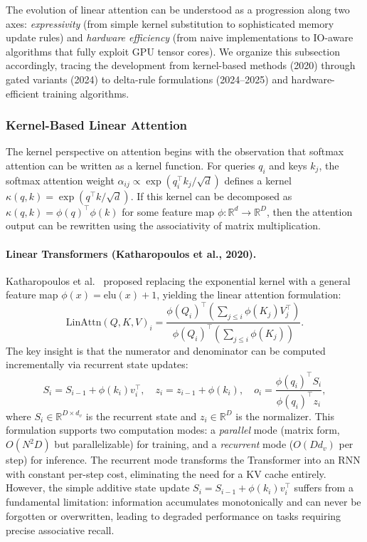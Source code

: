 The evolution of linear attention can be understood as a progression along two axes: \emph{expressivity} (from simple kernel substitution to sophisticated memory update rules) and \emph{hardware efficiency} (from naive implementations to IO-aware algorithms that fully exploit GPU tensor cores). We organize this subsection accordingly, tracing the development from kernel-based methods (2020) through gated variants (2024) to delta-rule formulations (2024--2025) and hardware-efficient training algorithms.

\subsubsection{Kernel-Based Linear Attention}
\label{subsubsec:kernel-linear}

The kernel perspective on attention begins with the observation that softmax attention can be written as a kernel function. For queries $q_i$ and keys $k_j$, the softmax attention weight $\alpha_{ij} \propto \exp(q_i^\top k_j / \sqrt{d})$ defines a kernel $\kappa(q, k) = \exp(q^\top k / \sqrt{d})$. If this kernel can be decomposed as $\kappa(q, k) = \phi(q)^\top \phi(k)$ for some feature map $\phi: \mathbb{R}^d \to \mathbb{R}^D$, then the attention output can be rewritten using the associativity of matrix multiplication.

\paragraph{Linear Transformers (Katharopoulos et al., 2020).}
Katharopoulos et al.~\cite{katharopoulos2020transformers} proposed replacing the exponential kernel with a general feature map $\phi(x) = \text{elu}(x) + 1$, yielding the linear attention formulation:
\begin{equation}
\text{LinAttn}(Q, K, V)_i = \frac{\phi(Q_i)^\top \left(\sum_{j \leq i} \phi(K_j) V_j^\top\right)}{\phi(Q_i)^\top \left(\sum_{j \leq i} \phi(K_j)\right)}.
\label{eq:linear-attn}
\end{equation}
The key insight is that the numerator and denominator can be computed incrementally via recurrent state updates:
\begin{equation}
S_i = S_{i-1} + \phi(k_i) v_i^\top, \quad z_i = z_{i-1} + \phi(k_i), \quad o_i = \frac{\phi(q_i)^\top S_i}{\phi(q_i)^\top z_i},
\label{eq:linear-attn-recurrent}
\end{equation}
where $S_i \in \mathbb{R}^{D \times d_v}$ is the recurrent state and $z_i \in \mathbb{R}^D$ is the normalizer. This formulation supports two computation modes: a \emph{parallel} mode (matrix form, $O(N^2 D)$ but parallelizable) for training, and a \emph{recurrent} mode ($O(D d_v)$ per step) for inference. The recurrent mode transforms the Transformer into an RNN with constant per-step cost, eliminating the need for a KV cache entirely. However, the simple additive state update $S_i = S_{i-1} + \phi(k_i) v_i^\top$ suffers from a fundamental limitation: information accumulates monotonically and can never be forgotten or overwritten, leading to degraded performance on tasks requiring precise associative recall.

